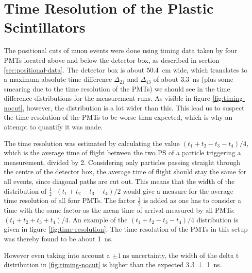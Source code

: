\section{Time Resolution of the Plastic Scintillators}

The positional cuts of muon events were done using timing data taken by four \acsp{PMT} located above and below the detector box, as described in section \ref{sec:positional-data}. The detector box is about \SI{50.4}{\centi\meter} wide, which translates to a maximum absolute time difference $\Delta_{21}$ and $\Delta_{43}$ of about \SI{3.3}{\nano\second} (plus some smearing due to the time resolution of the \acsp{PMT}) we should see in the time difference distributions for the measurement runs. As visible in figure \ref{fig:timing-nocut}, however, the distribution is a lot wider than this. This lead us to suspect the time resolution of the \acsp{PMT} to be worse than expected, which is why an attempt to quantify it was made.


The time resolution was estimated by calculating the value $(t_1 + t_2 - t_3 - t_4)/4$, which is the average time of flight between the two \ac{PS} of a particle triggering a measurement, divided by \num{2}. 
Considering only particles passing straight through the centre of the detector box, the average time of flight should stay the same for all events, since diagonal paths are cut out.
This means that the width of the distribution of $\frac{1}{2}\cdot (t_1 + t_2 - t_3 - t_4)/2$ would give a measure for the average time resolution of all four \acsp{PMT}. The factor $\frac{1}{2}$ is added as one has to consider a time with the same factor as the mean time of arrival measured by all \acsp{PMT}: $(t_1 + t_2 + t_3 + t_4)/4$.
An example of the $(t_1 + t_2 - t_3 - t_4)/4$ distribution is given in figure \ref{fig:time-resolution}. The time resolution of the \acsp{PMT} in this setup was thereby found to be about \SI{1}{\nano\second}. %

However even taking into account a $\pm \SI{1}{\nano\second}$ uncertainty, the width of the delta t distribution in \ref{fig:timing-nocut} is higher than the expected \SI{3.3 \pm 1}{\nano\second}. 

